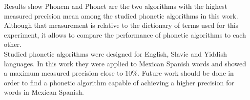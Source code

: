 \documentclass[9pt,conference]{IEEEtran}
\begin{document}
Results show Phonem and Phonet are the two algorithms with the highest measured 
precision mean among the studied phonetic algorithms in this work. Although that measurement
is relative to the dictionary of terms used for this experiment, it allows to compare
the performance of phonetic algorithms to each other.\\

Studied phonetic algorithms were designed for English, Slavic and  Yiddish languages. In 
this work they were applied to Mexican Spanish words and showed a maximum measured 
precision close to 10\%. Future work should be done in order to find a phonetic algorithm 
capable of achieving a higher precision for words in Mexican Spanish.\\




%
%



\end{document}
